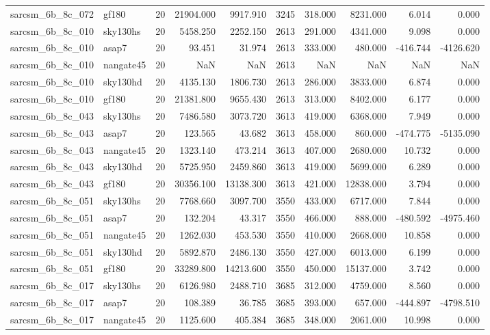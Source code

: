 \begin{longtable}{llrrrrrrrr}
sarcsm\_6b\_8c\_072 & gf180 & 20 & 21904.000 & 9917.910 & 3245 & 318.000 & 8231.000 & 6.014 & 0.000 \\
sarcsm\_6b\_8c\_010 & sky130hs & 20 & 5458.250 & 2252.150 & 2613 & 291.000 & 4341.000 & 9.098 & 0.000 \\
sarcsm\_6b\_8c\_010 & asap7 & 20 & 93.451 & 31.974 & 2613 & 333.000 & 480.000 & -416.744 & -4126.620 \\
sarcsm\_6b\_8c\_010 & nangate45 & 20 & NaN & NaN & 2613 & NaN & NaN & NaN & NaN \\
sarcsm\_6b\_8c\_010 & sky130hd & 20 & 4135.130 & 1806.730 & 2613 & 286.000 & 3833.000 & 6.874 & 0.000 \\
sarcsm\_6b\_8c\_010 & gf180 & 20 & 21381.800 & 9655.430 & 2613 & 313.000 & 8402.000 & 6.177 & 0.000 \\
sarcsm\_6b\_8c\_043 & sky130hs & 20 & 7486.580 & 3073.720 & 3613 & 419.000 & 6368.000 & 7.949 & 0.000 \\
sarcsm\_6b\_8c\_043 & asap7 & 20 & 123.565 & 43.682 & 3613 & 458.000 & 860.000 & -474.775 & -5135.090 \\
sarcsm\_6b\_8c\_043 & nangate45 & 20 & 1323.140 & 473.214 & 3613 & 407.000 & 2680.000 & 10.732 & 0.000 \\
sarcsm\_6b\_8c\_043 & sky130hd & 20 & 5725.950 & 2459.860 & 3613 & 419.000 & 5699.000 & 6.289 & 0.000 \\
sarcsm\_6b\_8c\_043 & gf180 & 20 & 30356.100 & 13138.300 & 3613 & 421.000 & 12838.000 & 3.794 & 0.000 \\
sarcsm\_6b\_8c\_051 & sky130hs & 20 & 7768.660 & 3097.700 & 3550 & 433.000 & 6717.000 & 7.844 & 0.000 \\
sarcsm\_6b\_8c\_051 & asap7 & 20 & 132.204 & 43.317 & 3550 & 466.000 & 888.000 & -480.592 & -4975.460 \\
sarcsm\_6b\_8c\_051 & nangate45 & 20 & 1262.030 & 453.530 & 3550 & 410.000 & 2668.000 & 10.858 & 0.000 \\
sarcsm\_6b\_8c\_051 & sky130hd & 20 & 5892.870 & 2486.130 & 3550 & 427.000 & 6013.000 & 6.199 & 0.000 \\
sarcsm\_6b\_8c\_051 & gf180 & 20 & 33289.800 & 14213.600 & 3550 & 450.000 & 15137.000 & 3.742 & 0.000 \\
sarcsm\_6b\_8c\_017 & sky130hs & 20 & 6126.980 & 2488.710 & 3685 & 312.000 & 4759.000 & 8.560 & 0.000 \\
sarcsm\_6b\_8c\_017 & asap7 & 20 & 108.389 & 36.785 & 3685 & 393.000 & 657.000 & -444.897 & -4798.510 \\
sarcsm\_6b\_8c\_017 & nangate45 & 20 & 1125.600 & 405.384 & 3685 & 348.000 & 2061.000 & 10.998 & 0.000 \\

\end{longtable}
